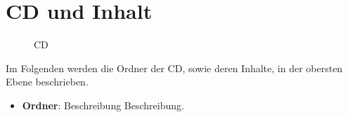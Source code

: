\chapter{CD und Inhalt}

\begin{figure}[!ht]
\centering
{}
\caption{CD}
\label{tbl:a-cd}
\end{figure}

\clearpage

Im Folgenden werden die Ordner der CD, sowie deren Inhalte, in der obersten Ebene beschrieben. 

\begin{itemize}
  \setlength{\itemsep}{0.5cm}
  \item \textbf{Ordner}: Beschreibung \newline Beschreibung.
\end{itemize}
